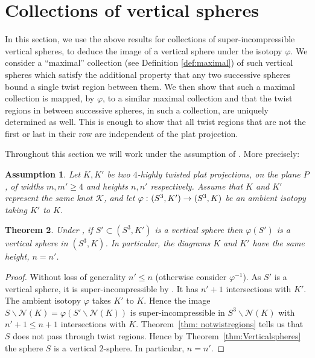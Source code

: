 \documentclass[12pt,reqno]{amsart}
\theoremstyle{plain}
\newtheorem{theorem}{Theorem}[section]
\newtheorem{assumption}[theorem]{Assumption}
\theoremstyle{definition}
\def\from{\thinspace\colon}
\newcommand{\NN}{\mathcal{N}}
\newcommand{\ssm}{\smallsetminus}
\begin{document}
\section{Collections of vertical spheres}\label{sec:Collections}
In this section, we use the above results for  collections of super-incompressible 
vertical spheres, to deduce the image of a vertical sphere under the isotopy $\varphi$. 
We consider a ``maximal'' collection (see Definition \ref{def:maximal}) of such 
vertical spheres which satisfy the additional property that any two 
successive spheres bound a single twist region between them. We then show that 
such a maximal collection is mapped, by $\varphi$, to a similar maximal 
collection and that the twist regions in between successive spheres, in such a 
collection, are uniquely determined as well. This is enough to show that all  
twist regions that are not the first or last in their row are independent 
of the  plat projection. 

\vskip7pt

Throughout this section we will work under the assumption of . 
More precisely:

\begin{assumption}\label{ass: basic assumption}
    Let $K,K'$ be two $4$-highly twisted plat projections, 
    on the plane $P$, of widths $m,m'\ge 4$ and heights $n,n'$ respectively. 
    Assume that $K$ and $K'$ represent the same knot $\mathcal{K}$, and 
    let $\varphi\from (S^3,K')\to (S^3,K)$ be an ambient isotopy taking $K'$ to $K$. 
\end{assumption}

\begin{theorem}\label{cor: verticaltovertical}  
Under , if $S'\subset(S^3, K')$ is a vertical 
sphere  then $\varphi (S')$ is a vertical sphere in $(S^3, K)$. In particular, 
 the diagrams $K$ and $K'$ have the same height, $n=n'$.
\end{theorem}

\begin{proof} 
Without loss of generality $n'\le n$  (otherwise consider $\varphi^{-1}$).
As $S'$ is a vertical sphere, it is super-incompressible by . 
It has $n'+1$ intersections with $K'$. The ambient isotopy 
$\varphi$ takes $K'$ to $K$. Hence the image $S \ssm \NN(K) =  \varphi(S' \ssm \NN(K))$ 
is super-incompressible in $S^3 \ssm \NN(K)$ with $n'+1 \leq n+1$ intersections with $K$. 
Theorem~\ref{thm: notwistregions} tells us that $S$ does not pass through twist 
regions. Hence by Theorem~\ref{thm:Verticalspheres} the sphere $S$ is a vertical  
$2$-sphere. In particular, $n=n'$.
\end{proof}
\end{document}
